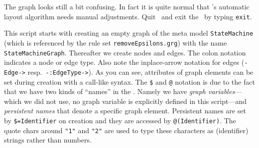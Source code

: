 The graph looks still a bit confusing.
In fact it is quite normal that \yComp's automatic layout algorithm needs manual adjustments.
Quit \yComp\ and exit the \GrShell\ by typing \texttt{exit}.

This script starts with creating an empty graph of the meta model \texttt{StateMachine} (which is referenced by the rule set \texttt{removeEpsilons.grg}) with the name \texttt{StateMachineGraph}.
Thereafter we create nodes and edges.
The colon notation indicates a node or edge type.
Also note the inplace-arrow notation for edges (\texttt{-Edge->} resp.\ \texttt{-:EdgeType->}).
As you can see, attributes of graph elements can be set during creation with a call-like syntax.
\makeatletter
The \texttt{\$} and \texttt{@} notation is due to the fact that we have two kinds of ``names'' in the \GrShell.
Namely we have \emph{graph variables}---which we did not use, no graph variable is explicitly defined in this script---and \emph{persistent names} that denote a specific graph element.
Persistent names are set by \texttt{\$=Identifier} on creation and they are accessed by \texttt{@(Identifier)}.
\makeatother
The quote chars around \texttt{"1"} and \texttt{"2"} are used to type these characters as (identifier) strings rather than numbers.


